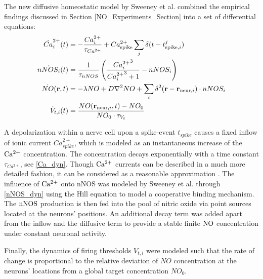 \documentclass[10pt,a4paper]{article}
\begin{document}
The new diffusive homeostatic model by Sweeney et al. combined the empirical findings discussed in Section \ref{NO_Experiments_Section} into a set of differential equations:   
\begin{align}
\dot{Ca}_i^{2+}(t) &= -\frac{Ca_i^{2+}}{\tau_{Ca^{2+}}} + Ca^{2+}_{\rm spike} \sum_{j} \delta(t-t^j_{\mathrm{spike},i}) \label{Ca_dyn}\\
\dot{nNOS_i}(t) &= \frac{1}{\tau_{nNOS}} \left(\frac{{Ca_i^{2+}}^3}{{Ca_i^{2+}}^3+1} - nNOS_i \right) \label{nNOS_dyn}\\
\dot{NO}(\mathbf{r},t)&=-\lambda NO + D \nabla^2 NO + \sum_{i} \delta^2(\mathbf{r}-\mathbf{r}_{\mathrm{neur},i})\cdot nNOS_i \label{NO_dyn}\\
\dot{V}_{t,i}(t) &= \frac{NO(\mathbf{r}_{\mathrm{neur},i},t)-NO_0}{NO_0\cdot\tau_{V_t}} \label{Theta_dyn}
\end{align}

A depolarization within a nerve cell upon a spike-event $t_{spike}$ causes a fixed inflow of ionic current $Ca^{2+}_{spike}$, which is modeled as an instantaneous increase of the $\rm Ca^{2+}$ concentration. The concentration decays exponentially with a time constant $\tau_{Ca^{2+}}$, see \eqref{Ca_dyn}. Though $\rm Ca^{2+}$ currents can be described in a much more detailed fashion, it can be considered as a reasonable approximation \cite[p.~198--203]{Theor_Neur_Dayan}. The influence of $\rm Ca^{2+}$ onto nNOS was modeled by Sweeney et al. through \eqref{nNOS_dyn} using the Hill equation \cite{Hill_Equ} to model a cooperative binding mechanism. The $\rm nNOS$ production is then fed into the pool of nitric oxide via point sources located at the neurons' positions. An additional decay term was added apart from the inflow and the diffusive term to provide a stable finite $\rm NO$ concentration under constant neuronal activity.

Finally, the dynamics of firing thresholds $V_{t,i}$ were modeled such that the rate of change is proportional to the relative deviation of $NO$ concentration at the neurons' locations from a global target concentration $NO_0$. 
\end{document}
